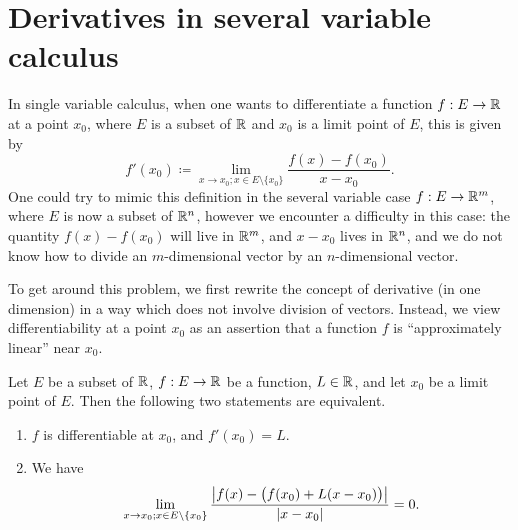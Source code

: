 \section{Derivatives in several variable calculus}\label{sec:6.2}

\begin{note}
  In single variable calculus, when one wants to differentiate a function \(f : E \to \mathbb{R}\) at a point \(x_0\), where \(E\) is a subset of \(\mathbb{R}\) and \(x_0\) is a limit point of \(E\), this is given by
  \[
    f'(x_0) \coloneqq \lim_{x \to x_0 ; x \in E \setminus \{x_0\}} \frac{f(x) - f(x_0)}{x - x_0}.
  \]
  One could try to mimic this definition in the several variable case \(f : E \to \mathbb{R}^m\), where \(E\) is now a subset of \(\mathbb{R}^n\), however we encounter a difficulty in this case:
  the quantity \(f(x) - f(x_0)\) will live in \(\mathbb{R}^m\), and \(x - x_0\) lives in \(\mathbb{R}^n\), and we do not know how to divide an \(m\)-dimensional vector by an \(n\)-dimensional vector.

  To get around this problem, we first rewrite the concept of derivative (in one dimension) in a way which does not involve division of vectors.
  Instead, we view differentiability at a point \(x_0\) as an assertion that a function \(f\) is ``approximately linear'' near \(x_0\).
\end{note}

\begin{lem}\label{6.2.1}
  Let \(E\) be a subset of \(\mathbb{R}\), \(f : E \to \mathbb{R}\) be a function, \(L \in \mathbb{R}\), and let \(x_0\) be a limit point of \(E\).
  Then the following two statements are equivalent.
  \begin{enumerate}
    \item \(f\) is differentiable at \(x_0\), and \(f'(x_0) = L\).
    \item We have
          \[
            \lim_{x \to x_0 ; x \in E \setminus \{x_0\}} \frac{\left\lvert f(x) - \big(f(x_0) + L (x - x_0)\big)\right\rvert}{\left\lvert x - x_0\right\rvert} = 0.
          \]
  \end{enumerate}
\end{lem}

